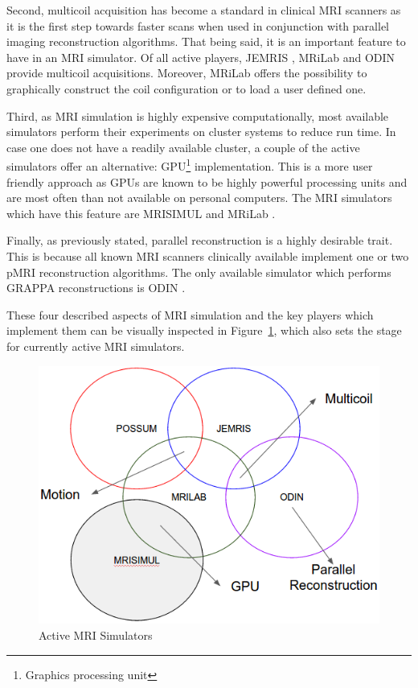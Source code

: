 Second, multicoil acquisition has become a standard in clinical MRI scanners as it is the first step towards faster scans when used in conjunction with parallel imaging reconstruction algorithms. That being said, it is an important feature to have in an MRI simulator. Of all active players, JEMRIS \cite{Stocker2010}, MRiLab \cite{Liu2013} and ODIN \cite{Jochimsen2004} provide multicoil acquisitions. Moreover, MRiLab \cite{Liu2013} offers the possibility to graphically construct the coil configuration or to load a user defined one.

Third, as MRI simulation is highly expensive computationally, most available simulators perform their experiments on cluster systems to reduce run time. In case one does not have a readily available cluster, a couple of the active simulators offer an alternative: GPU\footnote{Graphics processing unit} implementation. This is a more user friendly approach as GPUs are known to be highly powerful processing units and are most often than not available on personal computers. The MRI simulators which have this feature are MRISIMUL \cite{Xanthis2014} and MRiLab \cite{Liu2013}.

Finally, as previously stated, parallel reconstruction is a highly desirable trait. This is because all known MRI scanners clinically available implement one or two pMRI reconstruction algorithms. The only available simulator which performs GRAPPA reconstructions is ODIN \cite{Jochimsen2004}. 

These four described aspects of MRI simulation and the key players which implement them can be visually inspected in Figure~\ref{fig:activesim}, which also sets the stage for currently active MRI simulators.  

\begin{figure}[H]
    \centering
    \includegraphics[width=\textwidth,keepaspectratio]{activesim}
    \caption{Active MRI Simulators}
    \label{fig:activesim}
\end{figure}


